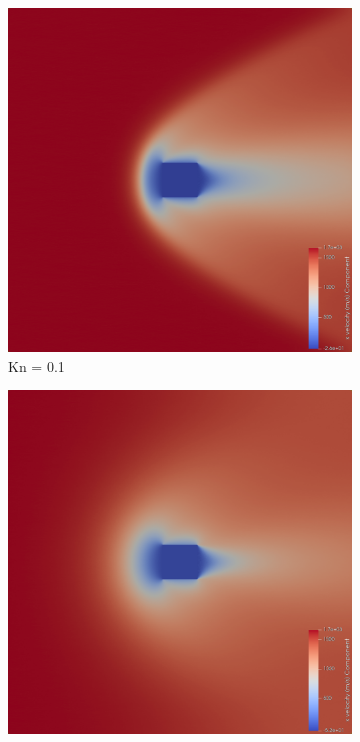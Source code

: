 \begin{figure}
    \vspace{5pt}
    
    \centering
    \begin{subfigure}{0.32\textwidth}
        \centering
        \includegraphics[width=\textwidth]{Images/4. Results/Square Kn/pv/Kn0.1.png}
        \caption{Kn = 0.1}
    \end{subfigure}
    \hfill
    \begin{subfigure}{0.32\textwidth}
        \centering
        \includegraphics[width=\textwidth]{Images/4. Results/Square Kn/pv/Kn0.5.png}

\end{subfigure}
\end{figure}
